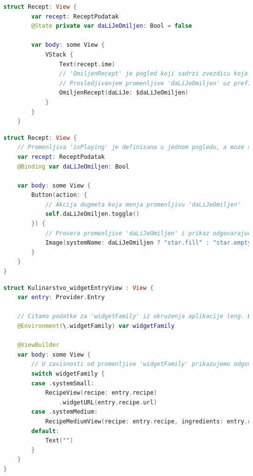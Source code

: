 \documentclass[12pt,oneside]{memoir}
\begin{document}
\begin{lstlisting}[caption=\textit{{Омотачи података - State}}, label={lst:Омотачи података - State}, language=Swift, frame=single]
    struct Recept: View {
        var recept: ReceptPodatak
        @State private var daLiJeOmiljen: Bool = false
        
        var body: some View {
            VStack {
                Text(recept.ime)
                // 'OmiljenRecept' je pogled koji sadrzi zvezdicu koja oznacava da li je recept medju omiljenima (puna zvezdica - jeste, prazna - nije) 
                // Prosledjivanjem promenljive 'daLiJeOmiljen' uz prefiks '$' omogucava se promena promenljive 'daLiJeOmiljen' u pogledu 'OmiljenRecept'
                OmiljenRecept(daLiJe: $daLiJeOmiljen)
            }
        }
    }
\end{lstlisting}

\begin{lstlisting}[caption=\textit{{Омотачи података - Binding}}, label={lst:Омотачи података - Binding}, language=Swift, frame=single]
    struct Recept: View {
    // Promenljiva 'isPlaying' je definisana u jednom pogledu, a moze se menjati u drugom
    var recept: ReceptPodatak
    @Binding var daLiJeOmiljen: Bool

    var body: some View {
        Button(action: {
            // Akcija dugmeta koja menja promenljivu 'daLiJeOmiljen'
            self.daLiJeOmiljen.toggle()
        }) {
            // Provera promenljive 'daLiJeOmiljen' i prikaz odgovarajuce slike
            Image(systemName: daLiJeOmiljen ? "star.fill" : "star.empty")
        }
    }
}
\end{lstlisting}

\begin{lstlisting}[caption=\textit{{Омотачи података - Environment}}, label={lst:Омотачи података - Environment}, language=Swift, frame=single]
    struct Kulinarstvo_widgetEntryView : View {
    var entry: Provider.Entry
    
    // Citamo podatke za 'widgetFamily' iz okruzenja aplikacije (eng. Environment) i smestamo ih u promenljivu 'widgetFamily'
    @Environment(\.widgetFamily) var widgetFamily
    
    @ViewBuilder
    var body: some View {
        // U zavisnosti od promenljive 'widgetFamily' prikazujemo odgovarajuci widget
        switch widgetFamily {
        case .systemSmall:
            RecipeView(recipe: entry.recipe)
                .widgetURL(entry.recipe.url)
        case .systemMedium:
            RecipeMediumView(recipe: entry.recipe, ingredients: entry.recipe.ingredients.count > 3 ? Array(entry.recipe.ingredients.dropLast(entry.recipe.ingredients.count - 3)) : entry.recipe.ingredients)
        default:
            Text("")
        }
    }
}
\end{lstlisting}
\end{document}
